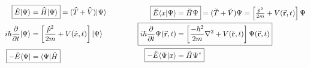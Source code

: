 \documentclass[12pt]{article}
\begin{document}
\vspace{5pt}\noindent
\[ 
    \begin{aligned}
        \Aboxed{ \breve{E} | \Psi \rangle 
            & = \widehat{H} | \Psi \rangle }
            = ( \widehat{T} + \widehat{V} ) | \Psi \rangle
            \\[5pt]
        i\hbar \frac{\partial}{\partial t} | \Psi \rangle 
            & = \left[ \frac{\hat{p}^2}{2m} + V(\hat{x}, t) \right] | \Psi \rangle
            \\[5pt]
        \Aboxed{ - \breve{E} \langle \Psi | 
            & = \langle \Psi | \hat{H} }
    \end{aligned}
    \hspace{1.5cm}
    \begin{aligned}
        \Aboxed{ \breve{E} \langle x | \Psi \rangle &= \breve{H} \Psi } = ( \breve{T} + \breve{V} ) \Psi
            = \left[ \tfrac{ \breve{p}^2 }{2m} + V(\vec{\mathbf{r}},t) \right] \Psi
            \\
        \Aboxed{ i \hbar \frac{\partial}{\partial t} \Psi(\vec{\mathbf{r}},t) 
            & = \left[ \frac{-\hbar^2}{2m} \nabla^2 
            + V(\breve{\mathbf{r}},t) \right] \Psi(\vec{\mathbf{r}},t) }
            \\
        \Aboxed{ - \breve{E} \langle \Psi | x \rangle
            & = \breve{H} \Psi^* }
    \end{aligned} 
\]
\end{document}
